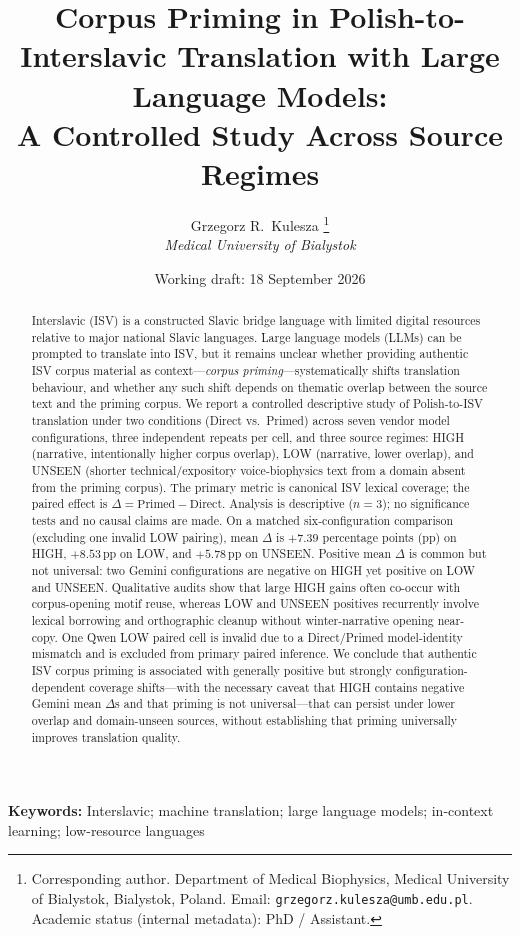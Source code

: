 \documentclass[11pt,a4paper]{article}
\title{Corpus Priming in Polish-to-Interslavic Translation with Large Language Models:\\
A Controlled Study Across Source Regimes}
\author{%
  Grzegorz R.\ Kulesza%
  \thanks{Corresponding author.
  Department of Medical Biophysics,
  Medical University of Bialystok, Bialystok, Poland.
  Email: \texttt{grzegorz.kulesza@umb.edu.pl}.
  Academic status (internal metadata): PhD / Assistant.}%
  \\[0.4em]
  \textit{Medical University of Bialystok}\\[0.6em]
  {\small\color{gray!60!black}
  }
}
\date{Working draft: 18 September 2026}
\begin{document}
\onehalfspacing
\maketitle

\begin{abstract}
Interslavic (ISV) is a constructed Slavic bridge language with limited digital resources relative to major national Slavic languages.
Large language models (LLMs) can be prompted to translate into ISV, but it remains unclear whether providing authentic ISV corpus material as context---\emph{corpus priming}---systematically shifts translation behaviour, and whether any such shift depends on thematic overlap between the source text and the priming corpus.
We report a controlled descriptive study of Polish-to-ISV translation under two conditions (Direct vs.\ Primed) across seven vendor model configurations, three independent repeats per cell, and three source regimes: HIGH (narrative, intentionally higher corpus overlap), LOW (narrative, lower overlap), and UNSEEN (shorter technical/expository voice-biophysics text from a domain absent from the priming corpus).
The primary metric is canonical ISV lexical coverage; the paired effect is $\Delta = \text{Primed} - \text{Direct}$.
Analysis is descriptive ($n{=}3$); no significance tests and no causal claims are made.
On a matched six-configuration comparison (excluding one invalid LOW pairing), mean $\Delta$ is $+7.39$ percentage points (pp) on HIGH, $+8.53$\,pp on LOW, and $+5.78$\,pp on UNSEEN.
Positive mean $\Delta$ is common but not universal: two Gemini configurations are negative on HIGH yet positive on LOW and UNSEEN.
Qualitative audits show that large HIGH gains often co-occur with corpus-opening motif reuse, whereas LOW and UNSEEN positives recurrently involve lexical borrowing and orthographic cleanup without winter-narrative opening near-copy.
One Qwen LOW paired cell is invalid due to a Direct/Primed model-identity mismatch and is excluded from primary paired inference.
We conclude that authentic ISV corpus priming is associated with generally positive but strongly configuration-dependent coverage shifts---with the necessary caveat that HIGH contains negative Gemini mean $\Delta$s and that priming is not universal---that can persist under lower overlap and domain-unseen sources, without establishing that priming universally improves translation quality.
\end{abstract}

\noindent\textbf{Keywords:}
Interslavic;
machine translation;
large language models;
in-context learning;
low-resource languages

\tableofcontents
\newpage






















\end{document}
